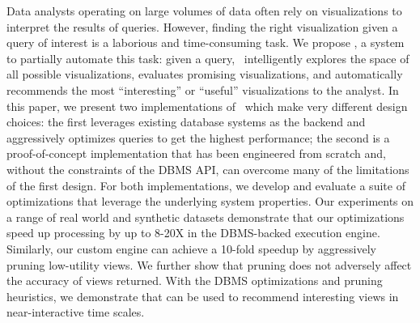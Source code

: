 

Data analysts operating on large volumes of data often rely on visualizations to
interpret the results of queries.
However, finding the right visualization given a query of interest is a
laborious and time-consuming task.
We propose \SeeDB, a system to partially automate this task:
given a query, \SeeDB\ intelligently explores the space of all possible
visualizations, evaluates promising visualizations, and automatically recommends
the most ``interesting'' or ``useful'' visualizations to the analyst.
In this paper, we present two implementations of \SeeDB\ which make very
different design choices: the first leverages existing database systems as the
backend and aggressively optimizes queries to get the highest performance; the
second is a proof-of-concept implementation that has been engineered from
scratch and, without the constraints of the DBMS API, can overcome many of the
limitations of the first design.
For both implementations, we develop and evaluate a suite of optimizations that
leverage the underlying system properties.
Our experiments on a range of real world and synthetic datasets demonstrate
that our optimizations speed up processing by up to 8-20X in the DBMS-backed
execution engine.
Similarly, our custom engine can achieve a 10-fold speedup by aggressively
pruning low-utility views. We further show that pruning does not adversely
affect the accuracy of views returned.
With the DBMS optimizations and pruning heuristics, we demonstrate that
\SeeDB can be used to recommend interesting views in near-interactive time
scales.
